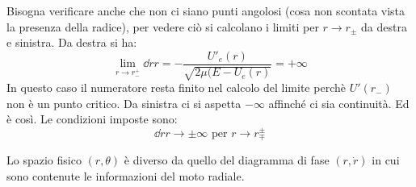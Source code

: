 \documentclass[Main.tex]{subfiles}
\begin{document}
\begin{tema}
\begin{osservazioni}
	\item Bisogna verificare anche che non ci siano punti angolosi (cosa non scontata vista la presenza della radice), per vedere ciò si calcolano i limiti per $r \rightarrow r_\pm$ da destra e sinistra. Da destra si ha:
	\begin{equation}
		\lim_{r \rightarrow r_-^+}\dd{\dot r}{r}= - \frac{U'_e(r)}{\sqrt{2 \mu (E-U_e(r)}}= + \infty
	\end{equation}
	In questo caso il numeratore resta finito nel calcolo del limite perchè $U'(r_-)$ non è un punto critico. Da sinistra ci si aspetta $- \infty$ affinché ci sia continuità. Ed è così. Le condizioni imposte sono:
	\begin{equation}
		\dd{\dot r}{r} \rightarrow \pm \infty \text{ per } r \rightarrow r_\mp^\pm
	\end{equation} 
	\item Lo spazio fisico $(r, \theta)$ è diverso da quello del diagramma di fase $(r, \dot r)$ in cui sono contenute le informazioni del moto radiale.
\end{osservazioni}
\end{tema}
\end{document}
